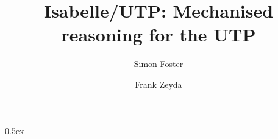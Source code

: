 \documentclass[11pt,a4paper]{article}
\begin{document}
\title{Isabelle/UTP: Mechanised reasoning for the UTP}

\author{Simon Foster \and Frank Zeyda}

\maketitle

\tableofcontents

\parindent 0pt\parskip 0.5ex




































%
%
\end{document}
